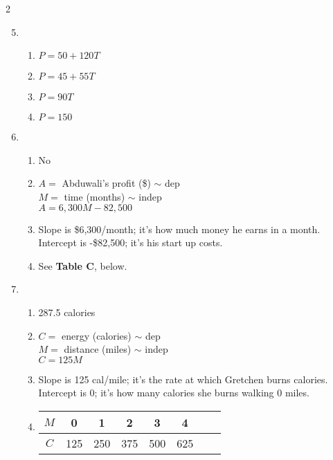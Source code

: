 \begin{multicols} {2}
\begin{enumerate}
\setcounter{enumi}{4}

\item %
\begin{enumerate}
\item $P=50+120T$
\item $P=45+55T$
\item $P=90T$
\item $P=150$
\end{enumerate}

\item %
\begin{enumerate}
\item No
\item $A=$ Abduwali's profit (\$) $\sim$ dep \\ $M=$ time (months) $\sim$ indep \\ $A = 6,300M-82,500$
\item Slope is \$6,300/month; it's how much money he earns in a month.\\  Intercept is -\$82,500; it's his start up costs.
\item See \textbf{Table C}, below.
\end{enumerate}

\item %
\begin{enumerate}
\item 287.5 calories
\item $C=$ energy (calories) $\sim$ dep \\ $M=$ distance (miles) $\sim$ indep \\ $C=125M$
\item Slope is 125 cal/mile; it's the rate at which Gretchen burns calories. \\ Intercept is 0; it's how many calories she burns walking 0 miles.
\item \begin{tabular} {|c| |c|c |c|c |c|c |c|}\hline
$M$ & 0 & 1 & 2 & 3 & 4 \\ \hline
$C$& 125 & 250 & 375 & 500 & 625  \\ \hline
\end{tabular}
\end{enumerate}


\end{enumerate}
\end{multicols}
